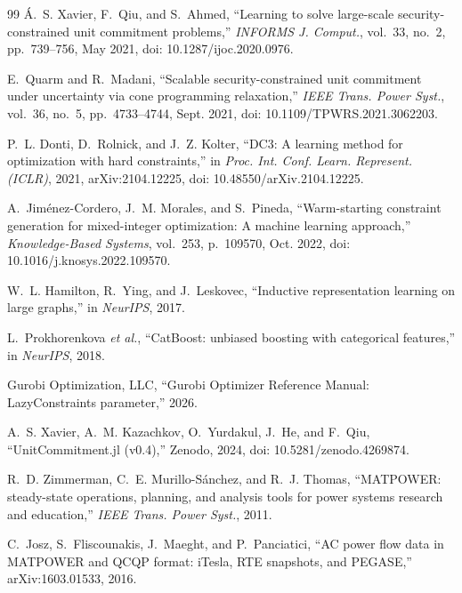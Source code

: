 \documentclass[runningheads]{llncs}
\begin{document}
\begin{thebibliography}{99}
 \'A.~S. Xavier, F.~Qiu, and S.~Ahmed, ``Learning to solve large-scale security-constrained unit commitment problems,'' \emph{INFORMS J. Comput.}, vol.~33, no.~2, pp.~739--756, May 2021, doi: 10.1287/ijoc.2020.0976.

E.~Quarm and R.~Madani, ``Scalable security-constrained unit commitment under uncertainty via cone programming relaxation,'' \emph{IEEE Trans. Power Syst.}, vol.~36, no.~5, pp.~4733--4744, Sept. 2021, doi: 10.1109/TPWRS.2021.3062203.

P.~L. Donti, D.~Rolnick, and J.~Z. Kolter, ``DC3: A learning method for optimization with hard constraints,'' in \emph{Proc. Int. Conf. Learn. Represent. (ICLR)}, 2021, arXiv:2104.12225, doi: 10.48550/arXiv.2104.12225.

A.~Jim\'enez-Cordero, J.~M. Morales, and S.~Pineda, ``Warm-starting constraint generation for mixed-integer optimization: A machine learning approach,'' \emph{Knowledge-Based Systems}, vol.~253, p.~109570, Oct. 2022, doi: 10.1016/j.knosys.2022.109570.

W.~L. Hamilton, R.~Ying, and J.~Leskovec, ``Inductive representation learning on large graphs,'' in \emph{NeurIPS}, 2017.

L.~Prokhorenkova \emph{et al.}, ``CatBoost: unbiased boosting with categorical features,'' in \emph{NeurIPS}, 2018.

Gurobi Optimization, LLC, ``Gurobi Optimizer Reference Manual: LazyConstraints parameter,'' 2026.

A.~S. Xavier, A.~M. Kazachkov, O.~Yurdakul, J.~He, and F.~Qiu, ``UnitCommitment.jl (v0.4),'' Zenodo, 2024, doi: 10.5281/zenodo.4269874.

R.~D. Zimmerman, C.~E. Murillo-S\'anchez, and R.~J. Thomas, ``MATPOWER: steady-state operations, planning, and analysis tools for power systems research and education,'' \emph{IEEE Trans. Power Syst.}, 2011.

C.~Josz, S.~Fliscounakis, J.~Maeght, and P.~Panciatici, ``AC power flow data in MATPOWER and QCQP format: iTesla, RTE snapshots, and PEGASE,'' arXiv:1603.01533, 2016.

\end{thebibliography}
\end{document}
